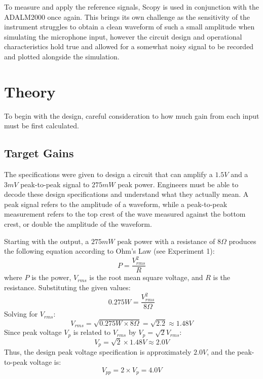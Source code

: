 \documentclass[12pt]{article}
\begin{document}
To measure and apply the reference signals, Scopy is used in conjunction with
the ADALM2000 once again. This brings its own challenge as the sensitivity of
the instrument struggles to obtain a clean waveform of such a small amplitude
when simulating the microphone input, however the circuit design and operational
characteristics hold true and allowed for a somewhat noisy signal to be recorded
and plotted alongside the simulation.
\section{Theory}
To begin with the design, careful consideration to how much gain from each input
must be first calculated.
\subsection{Target Gains}
The specifications were given to design a circuit that can amplify a $1.5V$ and
a $3mV$ peak-to-peak signal to $275mW$ peak power. Engineers must be able to
decode these design specifications and understand what they actually mean. A
peak signal refers to the amplitude of a waveform, while a peak-to-peak
measurement refers to the top crest of the wave measured against the bottom
crest, or double the amplitude of the waveform.


Starting with the output, a $275mW$ peak power with a resistance of $8\Omega$ produces the following equation according to Ohm's Law (see Experiment 1):
\begin{equation}
	P = \frac{V_{rms}^2}{R}
\end{equation}
where $P$ is the power, $V_{rms}$ is the root mean square voltage, and $R$ is the resistance. Substituting the given values:
\begin{equation}
	0.275W = \frac{V_{rms}^2}{8\Omega}
\end{equation}
Solving for $V_{rms}$:
\begin{equation}
	V_{rms} = \sqrt{0.275W \times 8\Omega} = \sqrt{2.2} \approx 1.48V
\end{equation}
Since peak voltage $V_p$ is related to $V_{rms}$ by $V_p = \sqrt{2} V_{rms}$:
\begin{equation}
	V_p = \sqrt{2} \times 1.48V \approx 2.0V
\end{equation}
Thus, the design peak voltage specification is approximately $2.0V$, and the peak-to-peak voltage is:
\begin{equation}
	V_{pp} = 2 \times V_p = 4.0V
\end{equation}
\end{document}
